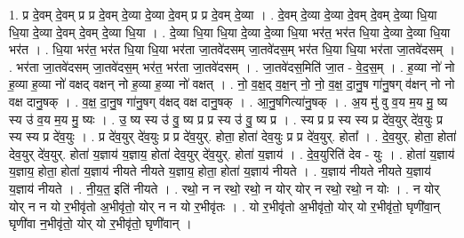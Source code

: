 \documentclass[17pt]{extarticle}
\begin{document}
1. प्र दे॒वम् दे॒वम् प्र प्र दे॒वम् दे॒व्या दे॒व्या दे॒वम् प्र प्र दे॒वम् दे॒व्या । . दे॒वम् दे॒व्या दे॒व्या दे॒वम् दे॒वम् दे॒व्या धि॒या धि॒या दे॒व्या दे॒वम् दे॒वम् दे॒व्या धि॒या । . दे॒व्या धि॒या धि॒या दे॒व्या दे॒व्या धि॒या भर॑त॒ भर॑त धि॒या दे॒व्या दे॒व्या धि॒या भर॑त । . धि॒या भर॑त॒ भर॑त धि॒या धि॒या भर॑ता जा॒तवे॑दसम् जा॒तवे॑दस॒म् भर॑त धि॒या धि॒या भर॑ता जा॒तवे॑दसम् । . भर॑ता जा॒तवे॑दसम् जा॒तवे॑दस॒म् भर॑त॒ भर॑ता जा॒तवे॑दसम् । . जा॒तवे॑दस॒मिति॑ जा॒त - वे॒द॒स॒म् । . ह॒व्या नो॑ नो ह॒व्या ह॒व्या नो॑ वक्षद् वक्षन् नो ह॒व्या ह॒व्या नो॑ वक्षत् । . नो॒ व॒क्ष॒द् व॒क्ष॒न् नो॒ नो॒ व॒क्ष॒ दा॒नु॒ष गा॑नु॒षग् व॑क्षन् नो नो वक्ष दानु॒षक् । . व॒क्ष॒ दा॒नु॒ष गा॑नु॒षग् व॑क्षद् वक्ष दानु॒षक् । . आ॒नु॒षगित्या॑नु॒षक् । . अ॒य मु॑ वु व॒य म॒य मु॒ ष्य स्य उ॑ व॒य म॒य मु॒ ष्यः । . उ॒ ष्य स्य उ॑ वु॒ ष्य प्र प्र स्य उ॑ वु॒ ष्य प्र । . स्य प्र प्र स्य स्य प्र दे॑व॒युर् दे॑व॒युः प्र स्य स्य प्र दे॑व॒युः । . प्र दे॑व॒युर् दे॑व॒युः प्र प्र दे॑व॒युर्. होता॒ होता॑ देव॒युः प्र प्र दे॑व॒युर्. होता᳚ । . दे॒व॒युर्. होता॒ होता॑ देव॒युर् दे॑व॒युर्. होता॑ य॒ज्ञाय॑ य॒ज्ञाय॒ होता॑ देव॒युर् दे॑व॒युर्. होता॑ य॒ज्ञाय॑ । . दे॒व॒युरिति॑ देव - युः । . होता॑ य॒ज्ञाय॑ य॒ज्ञाय॒ होता॒ होता॑ य॒ज्ञाय॑ नीयते नीयते य॒ज्ञाय॒ होता॒ होता॑ य॒ज्ञाय॑ नीयते । . य॒ज्ञाय॑ नीयते नीयते य॒ज्ञाय॑ य॒ज्ञाय॑ नीयते । . नी॒य॒त॒ इति॑ नीयते । . रथो॒ न न रथो॒ रथो॒ न योर् योर् न रथो॒ रथो॒ न योः । . न योर् योर् न न यो र॒भीवृ॑तो अ॒भीवृ॑तो॒ योर् न न यो र॒भीवृ॑तः । . यो र॒भीवृ॑तो अ॒भीवृ॑तो॒ योर् यो र॒भीवृ॑तो॒ घृणी॑वा॒न् घृणी॑वा न॒भीवृ॑तो॒ योर् यो र॒भीवृ॑तो॒ घृणी॑वान् । \newline
\end{document}
